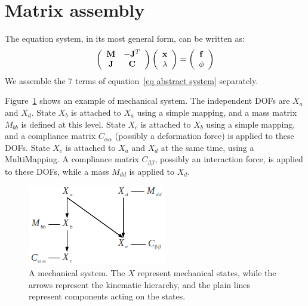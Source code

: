 \section{Matrix assembly}
The equation system, in its most general form, can be written as:
\begin{equation}
 \label{eq abstract system}
 \left( \begin{array}{cc}
\mathbf{M} & -\mathbf{J}^T \\
\mathbf{J} &  \mathbf{C} \end{array}\right)
\left( \begin{array}{c}
\mathbf{x} \\ \mathbf{\lambda}
\end{array}\right) = \left( \begin{array}{c}
\mathbf{f}  \\
\phi
\end{array}\right) 
\end{equation}
We assemble the $7$ terms of equation~\ref{eq abstract system} separately. 

Figure~\ref{fig system graph} shows an example of mechanical system.
The independent DOFs are $X_{a}$ and $X_d$.
State $X_b$ is attached to $X_a$ using a simple mapping, and a mass matrix $M_{bb}$ is defined at this level.
State $X_c$ is attached to $X_b$ using a simple mapping, and a compliance matrix $C_{\alpha \alpha}$ (possibly a deformation force) is applied to these DOFs.
State $X_e$ is attached to $X_a$ and  $X_d$ at the same time, using a MultiMapping. A compliance matrix $C_{\beta \beta}$, possibly an interaction force, is applied to these DOFs, 
while a mass $M_{dd}$ is applied to $X_d$.
\begin{figure}
\centering
 \includegraphics[width=0.49\linewidth]{system-graph.png}
\caption{A mechanical system. The $X$ represent mechanical states, while the arrows represent the kinematic hierarchy, and the plain lines represent components acting on the states.}
\label{fig system graph}
\end{figure}


